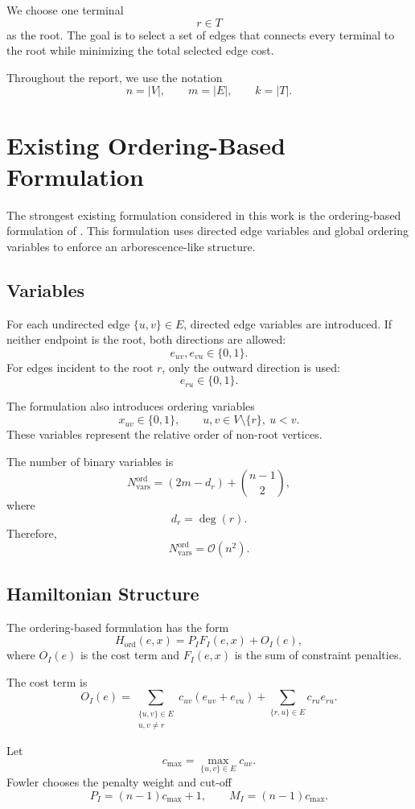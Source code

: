 \documentclass[a4paper,12pt]{report}
\begin{document}
We choose one terminal
\[
r\in T
\]
as the root. The goal is to select a set of edges that connects every terminal to the root while minimizing the total selected edge cost.

Throughout the report, we use the notation
\[
n=|V|,\qquad m=|E|,\qquad k=|T|.
\]

\section{Existing Ordering-Based Formulation}

The strongest existing formulation considered in this work is the ordering-based formulation of \cite{alex_2017}. This formulation uses directed edge variables and global ordering variables to enforce an arborescence-like structure.

\subsection{Variables}

For each undirected edge \(\{u,v\}\in E\), directed edge variables are introduced. If neither endpoint is the root, both directions are allowed:
\[
e_{uv}, e_{vu}\in\{0,1\}.
\]
For edges incident to the root \(r\), only the outward direction is used:
\[
e_{ru}\in\{0,1\}.
\]

The formulation also introduces ordering variables
\[
x_{uv}\in\{0,1\},
\qquad u,v\in V\setminus\{r\},\ u<v.
\]
These variables represent the relative order of non-root vertices.

The number of binary variables is
\[
N_{\text{vars}}^{\text{ord}}
=
(2m-d_r)
+
\binom{n-1}{2},
\]
where
\[
d_r=\deg(r).
\]
Therefore,
\[
N_{\text{vars}}^{\text{ord}}
=
\mathcal{O}(n^2).
\]

\subsection{Hamiltonian Structure}

The ordering-based formulation has the form
\[
H_{\text{ord}}(e,x)
=
P_I F_I(e,x)
+
O_I(e),
\]
where \(O_I(e)\) is the cost term and \(F_I(e,x)\) is the sum of constraint penalties.

The cost term is
\[
O_I(e)
=
\sum_{\substack{\{u,v\}\in E\\u,v\neq r}}
c_{uv}(e_{uv}+e_{vu})
+
\sum_{\{r,u\}\in E}
c_{ru}e_{ru}.
\]

Let
\[
c_{\max}=\max_{\{u,v\}\in E}c_{uv}.
\]
Fowler chooses the penalty weight and cut-off
\[
P_I=(n-1)c_{\max}+1,
\qquad
M_I=(n-1)c_{\max}.
\]
\end{document}
